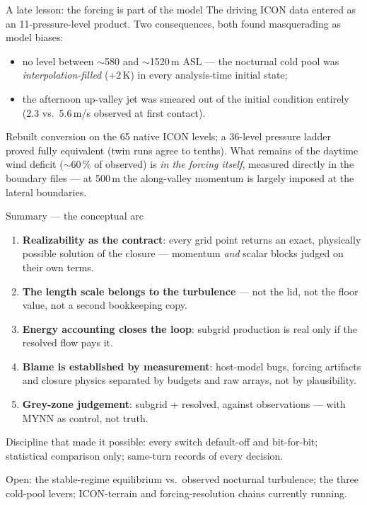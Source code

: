 \documentclass[10pt,aspectratio=169]{beamer}
\begin{document}
\begin{frame}{A late lesson: the forcing is part of the model}
  The driving ICON data entered as an 11-pressure-level product. Two
  consequences, both found masquerading as model biases:
  \vspace{1ex}
  \begin{itemize}
    \item no level between $\sim$580 and $\sim$1520\,m ASL --- the nocturnal
      cold pool was \emph{interpolation-filled} ($+2$\,K) in every analysis-time
      initial state;
    \item the afternoon up-valley jet was smeared out of the initial condition
      entirely (2.3 vs.\ 5.6\,m/s observed at first contact).
  \end{itemize}
  \vspace{1ex}
  Rebuilt conversion on the 65 native ICON levels; a 36-level pressure ladder
  proved fully equivalent (twin runs agree to tenths). What remains of the
  daytime wind deficit ($\sim$60\,\% of observed) is \emph{in the forcing
  itself}, measured directly in the boundary files --- at 500\,m the
  along-valley momentum is largely imposed at the lateral boundaries.
\end{frame}

\begin{frame}{Summary --- the conceptual arc}
  \begin{enumerate}
    \item \textbf{Realizability as the contract}: every grid point returns an
      exact, physically possible solution of the closure --- momentum
      \emph{and} scalar blocks judged on their own terms.
    \item \textbf{The length scale belongs to the turbulence} --- not the lid,
      not the floor value, not a second bookkeeping copy.
    \item \textbf{Energy accounting closes the loop}: subgrid production is
      real only if the resolved flow pays it.
    \item \textbf{Blame is established by measurement}: host-model bugs,
      forcing artifacts and closure physics separated by budgets and raw
      arrays, not by plausibility.
    \item \textbf{Grey-zone judgement}: subgrid + resolved, against
      observations --- with MYNN as control, not truth.
  \end{enumerate}
  \vspace{1ex}
  Discipline that made it possible: every switch default-off and bit-for-bit;
  statistical comparison only; same-turn records of every decision.
  \vspace{1ex}

  Open: the stable-regime equilibrium vs.\ observed nocturnal turbulence;
  the three cold-pool levers; ICON-terrain and forcing-resolution chains
  currently running.
\end{frame}
\end{document}
